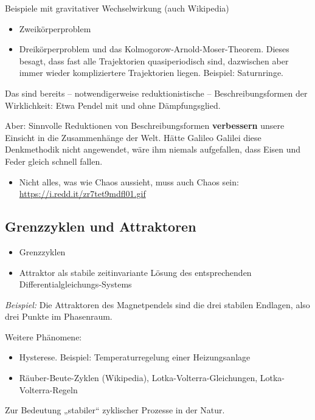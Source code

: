 \documentclass[11pt,a4paper]{article}
\begin{document}
Beispiele mit gravitativer Wechselwirkung (auch Wikipedia)
\begin{itemize}[noitemsep]
\item Zweikörperproblem
\item Dreikörperproblem und das Kolmogorow-Arnold-Moser-Theorem. Dieses
  besagt, dass fast alle Trajektorien quasiperiodisch sind, dazwischen aber
  immer wieder kompliziertere Trajektorien liegen. Beispiel: Saturnringe. 
\end{itemize}
Das sind bereits -- notwendigerweise reduktionistische -- Beschreibungsformen
der Wirklichkeit: Etwa Pendel mit und ohne Dämpfungsglied.

Aber: Sinnvolle Reduktionen von Beschreibungsformen \textbf{verbessern} unsere
Einsicht in die Zusammenhänge der Welt. Hätte Galileo Galilei diese
Denkmethodik nicht angewendet, wäre ihm niemals aufgefallen, dass Eisen und
Feder gleich schnell fallen.

\begin{itemize}[noitemsep]
\item Nicht alles, was wie Chaos aussieht, muss auch Chaos sein:\\
  \url{https://i.redd.it/zr7tet9mdfl01.gif}
\end{itemize}

\subsection{Grenzzyklen und Attraktoren}

\begin{itemize}[noitemsep]
\item Grenzzyklen
\item Attraktor als stabile zeitinvariante Lösung des entsprechenden
  Differentialgleichungs-Systems 
\end{itemize}

\emph{Beispiel:} Die Attraktoren des Magnetpendels sind die drei stabilen
Endlagen, also drei Punkte im Phasenraum.

Weitere Phänomene:
\begin{itemize}[noitemsep]
\item Hysterese. Beispiel: Temperaturregelung einer Heizungsanlage
\item Räuber-Beute-Zyklen (Wikipedia), Lotka-Volterra-Gleichungen,
  Lotka-Volterra-Regeln
\end{itemize}

Zur Bedeutung „stabiler“ zyklischer Prozesse in der Natur.
\end{document}
